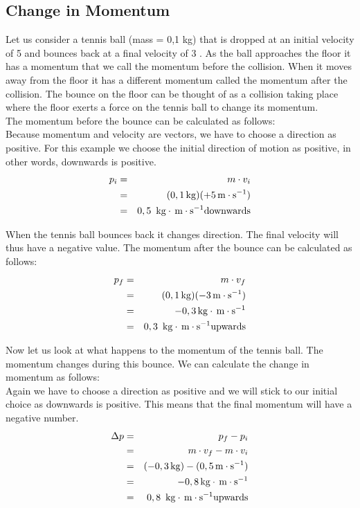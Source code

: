 \subsection{Change in Momentum}

Let us consider a tennis ball (mass = 0,1 kg) that is dropped at an initial velocity of 5 \ms and bounces back at a final velocity of 3 \ms. As the ball approaches the floor it has a momentum that we call the momentum before the collision. When it moves away from the floor it has a different momentum called the momentum after the collision. The bounce on the floor can be thought of as a collision taking place where the floor exerts a force on the tennis ball to change its momentum.\\

The momentum before the bounce can be calculated as follows:\\
Because momentum and velocity are vectors, we have to choose a direction as positive. For this example we choose the initial direction of motion as positive, in other words, downwards is positive.
\begin{eqnarray*}
p_{i} &=& m \cdot v_{i}\\
&=& (0,1 \,\mathrm{kg})(+5 \,\mathrm{m \cdot s^{-1}})\\
&=& 0,5\ \,\mathrm{kg}\cdot\,\mathrm{m \cdot s^{-1}} \mbox{downwards}
\end{eqnarray*}

When the tennis ball bounces back it changes direction. The final velocity will thus have a negative value.
The momentum after the bounce can be calculated as follows:\\
\begin{eqnarray*}
p_{f} &=& m \cdot v_{f}\\
&=& (0,1 \,\mathrm{kg})(-3 \,\mathrm{m \cdot s^{-1}})\\
&=& -0,3 \,\mathrm{kg}\cdot\,\mathrm{m \cdot s^{-1}}\\
&=& 0,3\ \,\mathrm{kg}\cdot\,\mathrm{m \cdot s^{-1}} \mbox{upwards}
\end{eqnarray*}

Now let us look at what happens to the momentum of the tennis ball. The momentum changes during this bounce. We can calculate the change in momentum as follows:\\
Again we have to choose a direction as positive and we will stick to our initial choice as downwards is positive. This means that the final momentum will have a negative number. \\
\begin{eqnarray*}
\Delta p &=& p_{f} - p_{i}\\
&=& m \cdot v_{f} - m \cdot v_{i}\\
&=& (-0,3 \,\mathrm{kg}) - (0,5 \,\mathrm{m \cdot s^{-1}})\\
&=& -0,8 \,\mathrm{kg}\cdot\,\mathrm{m \cdot s^{-1}}\\
&=& 0,8\ \,\mathrm{kg}\cdot\,\mathrm{m \cdot s^{-1}} \mbox{upwards}
\end{eqnarray*}

